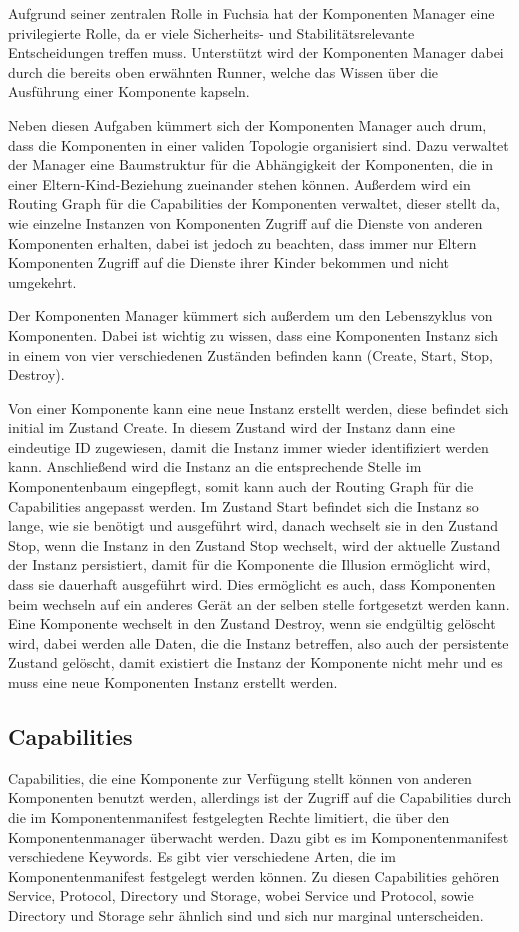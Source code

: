 \documentclass[a4paper]{scrartcl}
\begin{document}
Aufgrund seiner zentralen Rolle in Fuchsia hat der Komponenten Manager eine privilegierte Rolle, da er viele Sicherheits- und Stabilitätsrelevante Entscheidungen treffen muss. Unterstützt wird der Komponenten Manager dabei durch die bereits oben erwähnten Runner, welche das Wissen über die Ausführung einer Komponente kapseln.

Neben diesen Aufgaben kümmert sich der Komponenten Manager auch drum, dass die Komponenten in einer validen Topologie organisiert sind. Dazu verwaltet der Manager eine Baumstruktur für die Abhängigkeit der Komponenten, die in einer Eltern-Kind-Beziehung zueinander stehen können. Außerdem wird ein Routing Graph für die Capabilities der Komponenten verwaltet, dieser stellt da, wie einzelne Instanzen von Komponenten Zugriff auf die Dienste von anderen Komponenten erhalten, dabei ist jedoch zu beachten, dass immer nur Eltern Komponenten Zugriff auf die Dienste ihrer Kinder bekommen und nicht umgekehrt.

Der Komponenten Manager kümmert sich außerdem um den Lebenszyklus von Komponenten. Dabei ist wichtig zu wissen, dass eine Komponenten Instanz sich in einem von vier verschiedenen Zuständen befinden kann (Create, Start, Stop, Destroy).

Von einer Komponente kann eine neue Instanz erstellt werden, diese befindet sich initial im Zustand Create. In diesem Zustand wird der Instanz dann eine eindeutige ID zugewiesen, damit die Instanz immer wieder identifiziert werden kann. Anschließend wird die Instanz an die entsprechende Stelle im Komponentenbaum eingepflegt, somit kann auch der Routing Graph für die Capabilities angepasst werden. Im Zustand Start befindet sich die Instanz so lange, wie sie benötigt und ausgeführt wird, danach wechselt sie in den Zustand Stop, wenn die Instanz in den Zustand Stop wechselt, wird der aktuelle Zustand der Instanz persistiert, damit für die Komponente die Illusion ermöglicht wird, dass sie dauerhaft ausgeführt wird. Dies ermöglicht es auch, dass Komponenten beim wechseln auf ein anderes Gerät an der selben stelle fortgesetzt werden kann. Eine Komponente wechselt in den Zustand Destroy, wenn sie endgültig gelöscht wird, dabei werden alle Daten, die die Instanz betreffen, also auch der persistente Zustand gelöscht, damit existiert die Instanz der Komponente nicht mehr und es muss eine neue Komponenten Instanz erstellt werden.

\subsection{Capabilities}
\label{sec:Capabilities}
Capabilities, die eine Komponente zur Verfügung stellt können von anderen Komponenten benutzt werden, allerdings ist der Zugriff auf die Capabilities durch die im Komponentenmanifest festgelegten Rechte limitiert, die über den Komponentenmanager überwacht werden. Dazu gibt es im Komponentenmanifest verschiedene Keywords. Es gibt vier verschiedene Arten, die im Komponentenmanifest festgelegt werden können. Zu diesen Capabilities gehören Service, Protocol, Directory und Storage, wobei Service und Protocol, sowie Directory und Storage sehr ähnlich sind und sich nur marginal unterscheiden.
\end{document}
